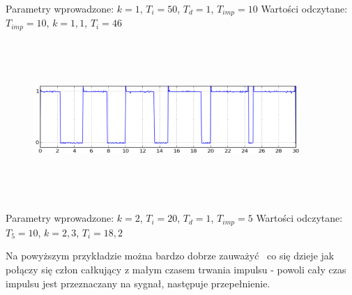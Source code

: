 \documentclass[a4paper, 12pt]{article}
\begin{document}
		Parametry wprowadzone: $k = 1$, $T_i = 50$, $T_d = 1$, $T_{imp} = 10 $ \newline
		Wartości odczytane: $T_{imp} = 10$, $k = 1,1$, $T_i = 46$
		\begin{figure}[H]
			\centering
			\includegraphics[width=0.9\textwidth, height=6cm]{./grafika/cudo2.png}
		\end{figure}
		Parametry wprowadzone: $k = 2$, $T_i = 20$, $T_d = 1$, $T_{imp} = 5 $ \newline
		Wartości odczytane: $T_{5} = 10$, $k = 2,3$, $T_i = 18,2$ \newline
		
		Na powyższym przykładzie można bardzo dobrze zauważyć \ co się dzieje jak połączy się człon całkujący z małym czasem trwania impulsu - powoli cały czas impulsu jest przeznaczany na sygnał, następuje przepełnienie.
\end{document}
